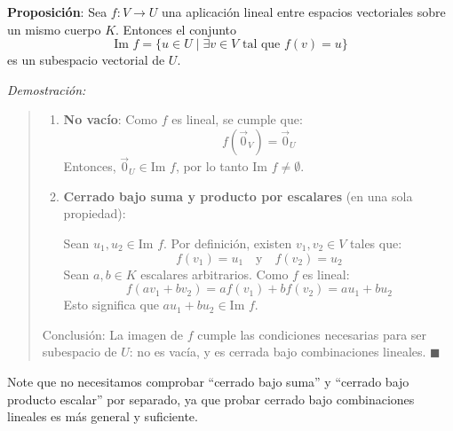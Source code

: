 \textbf{Proposición}: Sea \(f: V \to U\) una aplicación lineal entre espacios vectoriales sobre un mismo cuerpo \(K\). Entonces el conjunto
\[
\text{Im } f = \{ u \in U \mid \exists v \in V \text{ tal que } f(v) = u \}
\]
es un subespacio vectorial de \(U\).

\textit{Demostración:}
\begin{quote}
  \begin{enumerate}
    \item \textbf{No vacío}:
      Como \(f\) es lineal, se cumple que:
      \[
      f(\vec{0}_V) = \vec{0}_U
      \]
      Entonces, \(\vec{0}_U \in \text{Im } f\), por lo tanto \(\text{Im } f \ne \emptyset\).

    \item \textbf{Cerrado bajo suma y producto por escalares} (en una sola propiedad):

      Sean \(u_1, u_2 \in \text{Im } f\).
      Por definición, existen \(v_1, v_2 \in V\) tales que:
      \[
      f(v_1) = u_1 \quad \text{y} \quad f(v_2) = u_2
      \]
      Sean \(a, b \in K\) escalares arbitrarios. Como \(f\) es lineal:
      \[
      f(a v_1 + b v_2) = a f(v_1) + b f(v_2) = a u_1 + b u_2
      \]
      Esto significa que \(a u_1 + b u_2 \in \text{Im } f\).
  \end{enumerate}

  Conclusión: La imagen de \(f\) cumple las condiciones necesarias para ser subespacio de \(U\): no es vacía, y es cerrada bajo combinaciones lineales.
  \(\blacksquare\)
\end{quote}

\begin{tcolorbox}[title=Observaciones]
  Note que no necesitamos comprobar ``cerrado bajo suma'' y ``cerrado bajo producto escalar'' por separado, ya que probar cerrado bajo combinaciones lineales es más general y suficiente.
\end{tcolorbox}



